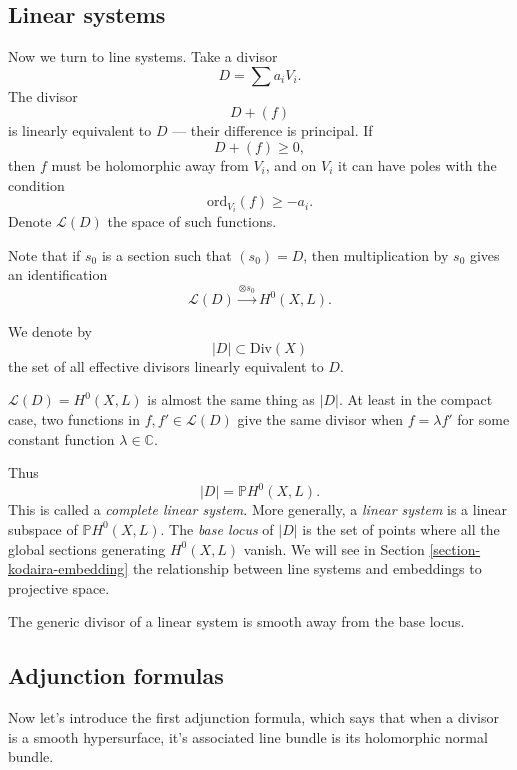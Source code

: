 \subsection{Linear systems}
\label{subsection-linear-systems}

\medskip\noindent
Now we turn to line systems.
Take a divisor
$$
D=\sum a_iV_i.
$$
The divisor
$$
D+(f)
$$
is linearly equivalent to $D$ --- their
difference is principal.
If
$$
D+(f)\geq 0,
$$
then $f$ must be holomorphic away from $V_i$,
and on $V_i$ it can have poles with the
condition
$$
\text{ord}_{V_i}(f) \geq  -a_i.
$$
Denote $\mathcal{L}(D)$ the space of such
functions.

Note that if $s_0$ is a section such that
$(s_0)=D$, then multiplication by $s_0$ gives
an identification
$$
\mathcal{L}(D) \xrightarrow{\otimes s_0}
H^0(X,L).
$$

\begin{definition}
\label{definition-line-system}
We denote by
$$
|D|\subset \text{Div}(X)
$$
the set of all effective divisors linearly
equivalent to $D$.
\end{definition}

\noindent
$\mathcal{L}(D)=H^0(X,L)$ is almost the same
thing as $|D|$.
At least in the compact case,
two functions in $f,f' \in \mathcal{L}(D)$
give the same divisor when $f=\lambda f'$
for some constant function $\lambda \in
\mathbb{C}$.

Thus
$$
|D|=\mathbb{P}H^0(X,L).
$$
This is called a {\it complete linear
system}.
More generally, a {\it linear system} is a
linear
subspace of $\mathbb{P}H^0(X,L)$.
The {\it base locus} of $|D|$
is the set of points where all the global
sections
generating $H^0(X,L)$ vanish.
We will see in Section
\ref{section-kodaira-embedding}
the relationship between line systems and
embeddings to projective space.

\begin{theorem}[Bertini]
\label{theorem-bertini}
The generic divisor of a linear system
is smooth away from the base locus.
\end{theorem}

\subsection{Adjunction formulas}
\label{subsection-adjunction-formulas}

\medskip\noindent
Now let's introduce the first adjunction
formula,
which says that when a divisor is a smooth
hypersurface,
it's associated line bundle is its
holomorphic normal bundle.


